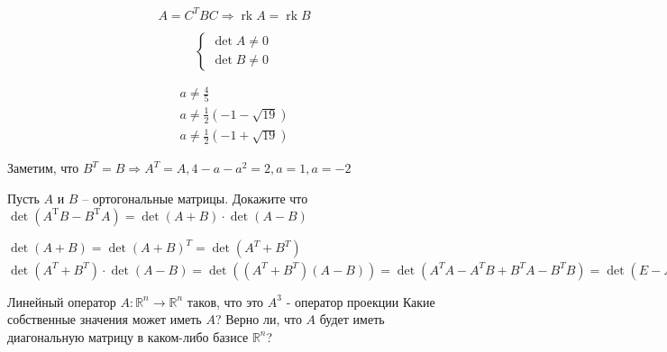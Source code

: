 \begin{solution}
	$$
	A=C^{T} B C
	\Longrightarrow 
	\operatorname{r k} A=\operatorname{r k} B
	$$
	
	$$
	\left\{\begin{array}{l}{\operatorname{det} A \neq 0} \\ {\operatorname{det} B \neq 0}\end{array}\right.
	$$
	
	$$
	\begin{array}{l}{a \neq \frac{4}{5}} \\ {a \neq \frac{1}{2}(-1-\sqrt{19})} \\ {a \neq \frac{1}{2}(-1+\sqrt{19})}\end{array}
	$$
	
	Заметим, что  $
	B^{T}=B \Longrightarrow 
	A^{T}=A , 
	4-a-a^{2}=2 , a = 1 , a = -2	
	$
\end{solution}


	
	
\begin{problem}
	Пусть $ A $ и $ B $ -- ортогональные матрицы. Докажите что 
	$ \displaystyle
	 \operatorname{det}\left(A^{\mathrm{T}} B-B^{\mathrm{T}} A\right)=\operatorname{det}(A+B) \cdot \operatorname{det}(A-B)
	$
\end{problem}

\begin{solution}
	$
	\operatorname{det}(A+B)=\operatorname{det}(A+B)^{T}=\operatorname{det}\left(A^{T}+B^{T}\right)
	$
	\\
	$ 
	\operatorname{det}\left(A^{T}+B^{T}\right) \cdot \operatorname{det}(A-B)= \operatorname{det}(\left(A^{ T}+B^{T}\right)(A-B)) = \operatorname{det}\left(A^{T} A-A^{T} B+B^{T} A-B^{T} B\right) = \operatorname{det}\left(E-A^{T} B+B^{T} A-E\right) = 
	\operatorname{det}\left(B^{T} A-A^{T} B\right) = \operatorname{det}\left(B^{T} A-A^{T} B\right)^{T}=
	\operatorname{det}\left(A^{T} B-B^{T} A\right)
	$
\end{solution}	


\begin{problem}
	Линейный оператор 
$
A: \mathbb{R}^{n} \longrightarrow \mathbb{R}^{n}
$
таков, что это $A^{3}$ - оператор проекции
Какие собственные значения может иметь $A$?  Верно ли, что $A$ будет иметь диагональную матрицу в каком-либо базисе $\mathbb{R}^{n}$?
\end{problem}		

